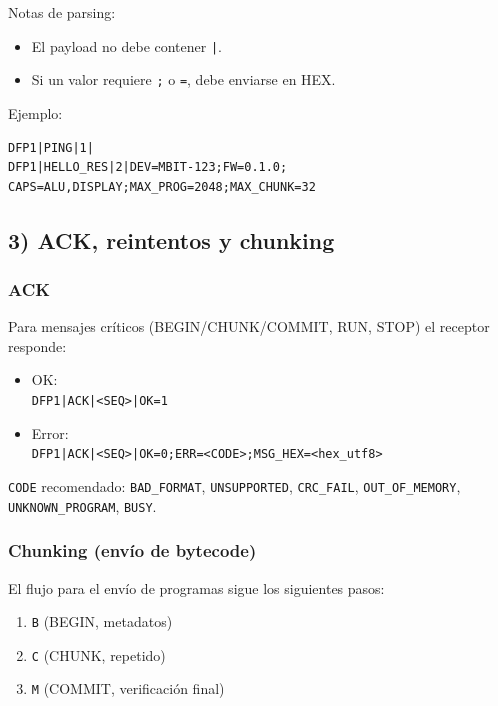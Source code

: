 Notas de parsing:
\begin{itemize}
    \item El payload no debe contener \texttt{|}.
    \item Si un valor requiere \texttt{;} o \texttt{=}, debe enviarse en HEX.
\end{itemize}

Ejemplo:
\begin{verbatim}
DFP1|PING|1|
DFP1|HELLO_RES|2|DEV=MBIT-123;FW=0.1.0;
CAPS=ALU,DISPLAY;MAX_PROG=2048;MAX_CHUNK=32
\end{verbatim}

\subsection*{3) ACK, reintentos y chunking}

\subsubsection*{ACK}

Para mensajes críticos (BEGIN/CHUNK/COMMIT, RUN, STOP) el receptor responde:

\begin{itemize}
    \item OK:\\
          \texttt{DFP1|ACK|<SEQ>|OK=1}
    \item Error:\\
          \texttt{DFP1|ACK|<SEQ>|OK=0;ERR=<CODE>;MSG\_HEX=<hex\_utf8>}
\end{itemize}

\texttt{CODE} recomendado: \texttt{BAD\_FORMAT}, \texttt{UNSUPPORTED}, \texttt{CRC\_FAIL}, \texttt{OUT\_OF\_MEMORY}, \texttt{UNKNOWN\_PROGRAM}, \texttt{BUSY}.

\subsubsection*{Chunking (envío de bytecode)}

El flujo para el envío de programas sigue los siguientes pasos:

\begin{enumerate}
    \item \texttt{B} (BEGIN, metadatos)
    \item \texttt{C} (CHUNK, repetido)
    \item \texttt{M} (COMMIT, verificación final)
\end{enumerate}

